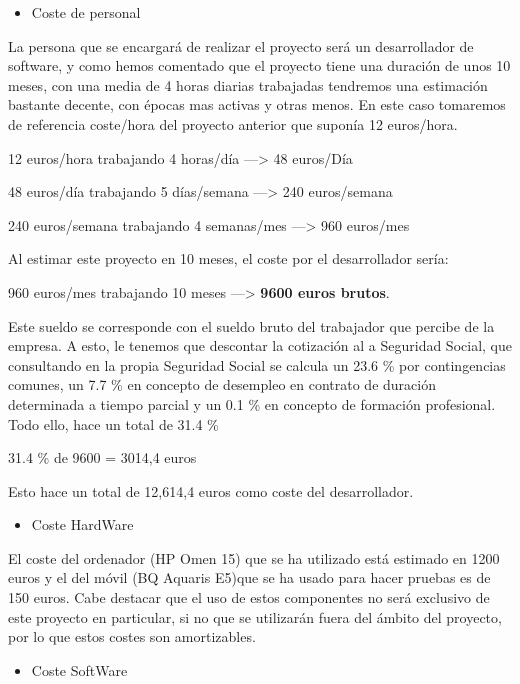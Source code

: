 \begin{itemize}
\item Coste de personal
\end{itemize}

La persona que se encargará de realizar el proyecto será un desarrollador de software, y como hemos comentado que el proyecto tiene una duración de unos 10 meses, con una media de 4 horas diarias trabajadas tendremos una estimación bastante decente, con épocas mas activas y otras menos. En este caso tomaremos de referencia coste/hora del proyecto anterior que suponía 12 euros/hora.

12 euros/hora trabajando 4 horas/día ---> 48 euros/Día

48 euros/día trabajando 5 días/semana ---> 240 euros/semana

240 euros/semana trabajando 4 semanas/mes ---> 960 euros/mes

Al estimar este proyecto en 10 meses, el coste por el desarrollador sería:

960 euros/mes trabajando 10 meses ---> \textbf{9600 euros brutos}.

Este sueldo se corresponde con el sueldo bruto del trabajador que percibe de la empresa. A esto, le tenemos que descontar la cotización al a Seguridad Social, que consultando en la propia Seguridad Social se calcula un 23.6 \% por contingencias comunes, un 7.7 \% en concepto de desempleo en contrato de duración determinada a tiempo parcial y un 0.1 \% en concepto de formación profesional. Todo ello, hace un total de 31.4 \%

31.4 \% de 9600 = 3014,4 euros

Esto hace un total de 12,614,4 euros como coste del desarrollador.

\begin{itemize}
\item Coste HardWare
\end{itemize}

El coste del ordenador (HP Omen 15) que se ha utilizado está estimado en 1200 euros y el del móvil (BQ Aquaris E5)que se ha usado para hacer pruebas es de 150 euros. Cabe destacar que el uso de estos componentes no será exclusivo de este proyecto en particular, si no que se utilizarán fuera del ámbito del proyecto, por lo que estos costes son amortizables.


\begin{itemize}
\item Coste SoftWare
\end{itemize}

